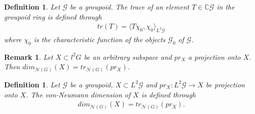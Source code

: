 \documentclass[12pt,a4paper]{scrartcl}
\newtheorem{Definition}[Theorem]{Definition}
\newtheorem{Remark}[Theorem]{Remark}
\numberwithin{equation}{section}
\newcommand{\C}{\mathbb{C}} %
\newcommand{\2}{\mathbb{Z} / 2 \mathbb{Z}}
\newcommand{\G}{\mathcal{G}}
\newcommand{\1}{\bar{1}}
\newcommand{\0}{\bar{0}}
\begin{document}
\begin{Definition}
	Let $\G$ be a groupoid. The trace of an element $T \in \C \G$ in the groupoid ring is defined through
	\begin{align*}
		tr(T) = \langle T \chi_0, \chi_0 \rangle_{L^2 \G}
	\end{align*}
	where $\chi_0$ is the characteristic function of the objects $\G_0$ of $\G$.
\end{Definition}
\begin{Remark}
	Let $X \subset l^2G$ be an arbitrary subspace and $pr_X$ a projection onto $X$. Then $dim_{\mathcal{N}(G)}(X) = tr_{\mathcal{N}(G)}(pr_X)$.
\end{Remark}
\begin{Definition}
	Let $\G$ be a groupoid, $X \subset L^2 \G$ and $pr_X: L^2 \G \to X$ be projection onto $X$. The von-Neumann dimension of $X$ is defined through
	\begin{align*}
		dim_{\mathcal{N}(G)}(X) = tr_{\mathcal{N}(G)}(pr_X).
	\end{align*}
\end{Definition}
\end{document}
